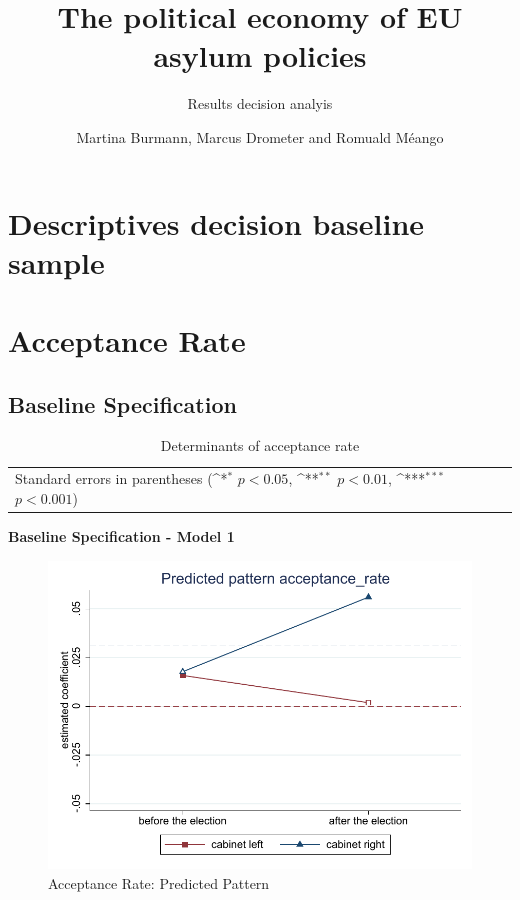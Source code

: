\documentclass[10pt,a4paper]{scrartcl}
\begin{document}
	\title{The political economy of EU asylum policies}
	\subtitle{Results decision analyis}
	\author{Martina Burmann, Marcus Drometer and Romuald Méango}
	\maketitle


\tableofcontents

\clearpage
\FloatBarrier
\section{Descriptives decision baseline sample}

 
 
 
 

\clearpage
\FloatBarrier
\section{Acceptance Rate}
\subsection{Baseline Specification}
\begin{table}[!ht]\centering
\renewcommand{\arraystretch}{1.25}
\small
\def\sym#1{\ifmmode^{#1}\else\(^{#1}\)\fi}
\caption{Determinants of acceptance rate}
\begin{tabular}{l*{3}{c}}
	\hline\hline
	
	\hline\hline
	\multicolumn{4}{l}{\footnotesize Standard errors in parentheses (\sym{*} \(p<0.05\), \sym{**} \(p<0.01\), \sym{***} \(p<0.001\))}\\
\end{tabular}
\end{table}

\clearpage
\textbf{Baseline Specification - Model 1}
\begin{figure}[!ht]
	\centering
	\includegraphics[width=1\textwidth]{figures_edited/acceptance_rate_graph1_baseline.pdf}
	\caption{Acceptance Rate: Predicted Pattern}
\end{figure}
\end{document}
